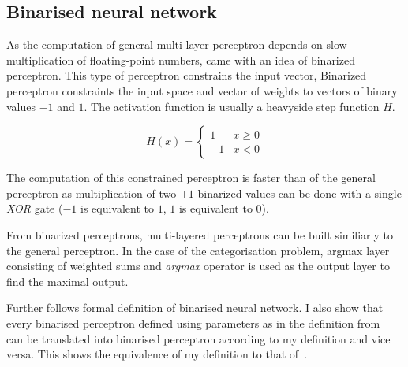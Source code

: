 \sectionsep{}

\subsection{Binarised neural network}

As the computation of general multi-layer perceptron depends on slow multiplication of
floating-point numbers, %
came with an idea of binarized perceptron. This type of perceptron constrains
the input vector, 
Binarized perceptron constraints the input space and vector of weights
to vectors of binary values $-1$ and $1$. The activation function is usually
a heavyside step function $H$.

\begin{equation*}
	H(x) = \left\{\begin{array}{ll}
			1 & x \geq 0\\
			-1 & x < 0
		\end{array}\right.
\end{equation*}

The computation of this constrained perceptron is faster than of the general perceptron
as multiplication of two $\pm 1$-binarized values can be done with a single \textit{XOR}
gate ($-1$ is equivalent to $1$, $1$ is equivalent to $0$).

From binarized perceptrons, multi-layered perceptrons can be built similiarly
to the general perceptron. In the case of the categorisation problem,
argmax layer consisting of weighted sums and \textit{argmax} operator is used
as the output layer to find the maximal output. %

Further follows formal definition of binarised neural network. I also show that
every binarised perceptron defined using parameters as in the definition 
from~\cite{zhang2021bdd4bnn} can be translated into binarised perceptron
according to my definition and vice versa. This shows the equivalence
of my definition to that of~\cite{zhang2021bdd4bnn}.

\sectionsep{}

